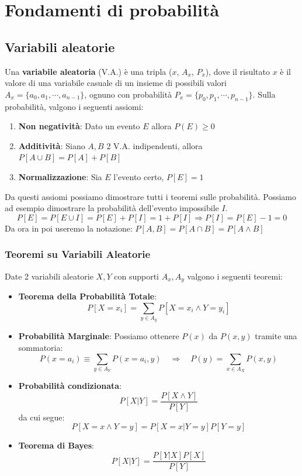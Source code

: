 \chapter{Fondamenti di probabilità}

\section{Variabili aleatorie}
Una \textbf{variabile aleatoria} (V.A.) è una tripla ($x$, $A_x$, $P_x$), dove il risultato $x$ è il valore di una variabile casuale di un insieme di possibili valori $A_x=\{a_0,a_1,\cdots,a_{n-1}\}$, ognuno con probabilità $P_x=\{p_0, p_1,\cdots,p_{n-1}\}$.
%
Sulla probabilità, valgono i seguenti assiomi:
\begin{enumerate}
	\item \textbf{Non negatività}: Dato un evento $E$ allora $P(E) \ge0$
	\item \textbf{Additività}: Siano $A,B$ 2 V.A. indipendenti, allora $P[A\cup B]=P[A]+P[B]$
	\item \textbf{Normalizzazione}: Sia $E$ l'evento certo, $P[E]=1 $
\end{enumerate}

Da questi assiomi possiamo dimostrare tutti i teoremi sulle probabilità. Possiamo ad esempio dimostrare la probabilità dell'evento impossibile $I$.
$$P[E] = P[E\cup I]=P[E]+P[I]=1+P[I]\Rightarrow P[I] = P[E]-1 = 0$$
Da ora in poi useremo la notazione: $P[A,B] = P[A\cap B] = P[A\wedge B]$

\subsection{Teoremi su Variabili Aleatorie}
Date 2 variabili aleatorie $X,Y$ con supporti $A_x,A_y$ valgono i seguenti teoremi:
\begin{itemize}
	\item \textbf{Teorema della Probabilità Totale}: $$
	P[X=x_i]=\sum_{y\in A_y}P[X=x_i \wedge Y = y_i]$$
	\item \textbf{Probabilità Marginale}: Possiamo ottenere $P(x)$ da $P(x,y)$ tramite una sommatoria: 
	$$
	P(x=a_i) \equiv \sum_{y\in A_Y} P(x=a_i, y) \quad \Rightarrow \quad P(y) = \sum_{x\in A_X} P(x,y)
	$$
	\item \textbf{Probabilità condizionata}: $$P[X|Y]=\frac{P[X\wedge Y]}{P[Y]}$$
	da cui segue: $$P[X=x\wedge Y =y]=P[X=x|Y=y]P[Y=y]$$
	\item \textbf{Teorema di Bayes}: $$P[X|Y] = \frac{P[Y|X]P[X]}{P[Y]}$$
\end{itemize}

